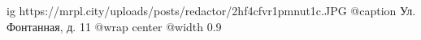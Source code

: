  
 
 
 
 

\ifcmt
  ig https://mrpl.city/uploads/posts/redactor/2hf4cfvr1pmnut1c.JPG
	@caption Ул. Фонтанная, д. 11
  @wrap center
  @width 0.9
\fi
